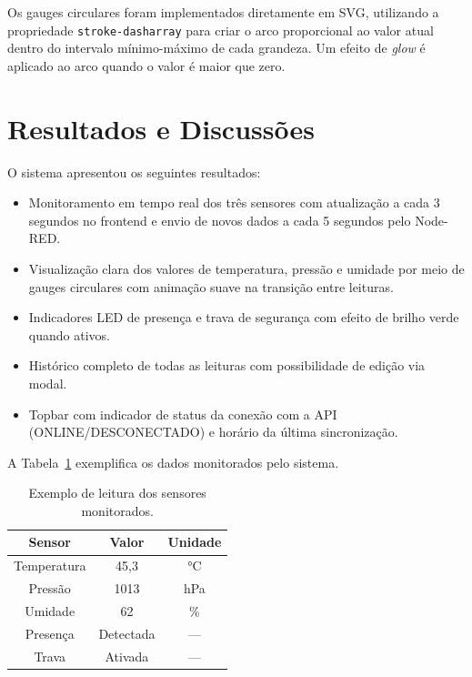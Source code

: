 \documentclass[12pt]{unisenaiclass}
\begin{document}
Os gauges circulares foram implementados diretamente em SVG, utilizando a propriedade \texttt{stroke-dasharray} para criar o arco proporcional ao valor atual dentro do intervalo mínimo-máximo de cada grandeza. Um efeito de \textit{glow} é aplicado ao arco quando o valor é maior que zero.

\section{Resultados e Discussões}

O sistema apresentou os seguintes resultados:

\begin{itemize}
    \item Monitoramento em tempo real dos três sensores com atualização a cada 3 segundos no frontend e envio de novos dados a cada 5 segundos pelo Node-RED.
    \item Visualização clara dos valores de temperatura, pressão e umidade por meio de gauges circulares com animação suave na transição entre leituras.
    \item Indicadores LED de presença e trava de segurança com efeito de brilho verde quando ativos.
    \item Histórico completo de todas as leituras com possibilidade de edição via modal.
    \item Topbar com indicador de status da conexão com a API (ONLINE/DESCONECTADO) e horário da última sincronização.
\end{itemize}

A Tabela~\ref{tab:sensores} exemplifica os dados monitorados pelo sistema.

\begin{table}[H]
    \centering
    \caption{Exemplo de leitura dos sensores monitorados.}
    \label{tab:sensores}
    \begin{tabular}{|c|c|c|}
        \hline
        \textbf{Sensor} & \textbf{Valor} & \textbf{Unidade} \\ \hline
        Temperatura  & 45,3  & °C   \\ \hline
        Pressão      & 1013  & hPa  \\ \hline
        Umidade      & 62    & \%   \\ \hline
        Presença     & Detectada & —  \\ \hline
        Trava        & Ativada   & —  \\ \hline
    \end{tabular}
\end{table}
\end{document}
